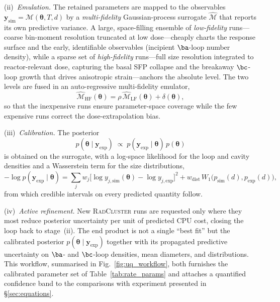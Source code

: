 (ii)~\emph{Emulation.} The retained parameters are mapped to the
observables $\mathbf{y}_{\mathrm{sim}}=\mathcal{M}(\boldsymbol{\theta},T,d)$
by a \emph{multi-fidelity} Gaussian-process surrogate
$\widehat{\mathcal{M}}$ that reports its own predictive variance. A large,
space-filling ensemble of \emph{low-fidelity} runs---coarse bin-moment
resolution truncated at low dose---cheaply charts the response surface and
the early, identifiable observables (incipient $\ba$-loop number density),
while a sparse set of \emph{high-fidelity} runs---full size resolution
integrated to reactor-relevant dose, capturing the basal SFP collapse and
the breakaway $\bc$-loop growth that drives anisotropic strain---anchors
the absolute level. The two levels are fused in an auto-regressive
multi-fidelity emulator,
\begin{equation}\label{eq:mf_gp}
  \widehat{\mathcal{M}}_{\mathrm{HF}}(\boldsymbol{\theta})
  =\rho\,\widehat{\mathcal{M}}_{\mathrm{LF}}(\boldsymbol{\theta})
  +\delta(\boldsymbol{\theta}),
\end{equation}
so that the inexpensive runs ensure parameter-space coverage while the few
expensive runs correct the dose-extrapolation bias.

(iii)~\emph{Calibration.} The posterior
\begin{equation}\label{eq:posterior}
  p(\boldsymbol{\theta}\mid\mathbf{y}_{\mathrm{exp}})\;\propto\;
  p(\mathbf{y}_{\mathrm{exp}}\mid\boldsymbol{\theta})\,p(\boldsymbol{\theta})
\end{equation}
is obtained on the surrogate, with a log-space likelihood for the loop and
cavity densities and a Wasserstein term for the size distributions,
\begin{equation}\label{eq:loss_uq}
  -\log p(\mathbf{y}_{\mathrm{exp}}\mid\boldsymbol{\theta})=
  \sum_{j} w_j\bigl[\log y_{j,\mathrm{sim}}(\boldsymbol{\theta})
        -\log y_{j,\mathrm{exp}}\bigr]^2
  + w_{\mathrm{dist}}\,W_1\!\bigl(p_{\mathrm{sim}}(d),p_{\mathrm{exp}}(d)\bigr),
\end{equation}
from which credible intervals on every predicted quantity follow.

(iv)~\emph{Active refinement.} New \textsc{RadCluster} runs are requested
only where they most reduce posterior uncertainty per unit of predicted CPU
cost, closing the loop back to stage~(ii). The end product is not a single
``best fit'' but the calibrated posterior
$p(\boldsymbol{\theta}\mid\mathbf{y}_{\mathrm{exp}})$ together with its
propagated predictive uncertainty on $\ba$- and $\bc$-loop densities, mean
diameters, and distributions. This workflow, summarised in
Fig.~\ref{fig:uq_workflow}, both furnishes the calibrated parameter set of
Table~\ref{tab:rate_params} and attaches a quantified confidence band to
the comparisons with experiment presented in \S\ref{sec:equations}.


